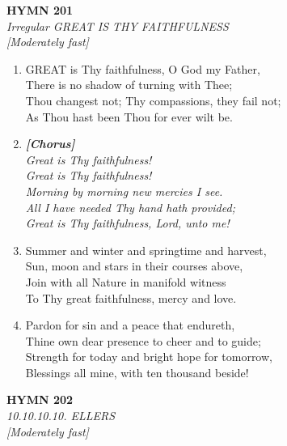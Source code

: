 \documentclass[11pt,a4paper]{article}
\begin{document}
\newpage
\begin{center}
    {\Large \textbf{HYMN 201}}
    \\
    \textit{Irregular GREAT IS THY FAITHFULNESS}
    \\
    \textit{\small [Moderately fast]}
\end{center}
\vspace{1em}

\begin{enumerate}
    \item GREAT is Thy faithfulness, O God my Father, \\
        There is no shadow of turning with Thee; \\
        Thou changest not; Thy compassions, they fail not; \\
        As Thou hast been Thou for ever wilt be.

    \item[] \vspace{0.4em}
    \textbf{\textit{[Chorus]}} \\
    \textit{Great is Thy faithfulness!} \\
    \textit{Great is Thy faithfulness!} \\
    \textit{Morning by morning new mercies I see.} \\
    \textit{All I have needed Thy hand hath provided;} \\
    \textit{Great is Thy faithfulness, Lord, unto me!}
    \vspace{0.4em}

    \item Summer and winter and springtime and harvest, \\
        Sun, moon and stars in their courses above, \\
        Join with all Nature in manifold witness \\
        To Thy great faithfulness, mercy and love.

    \item Pardon for sin and a peace that endureth, \\
        Thine own dear presence to cheer and to guide; \\
        Strength for today and bright hope for tomorrow, \\
        Blessings all mine, with ten thousand beside!

\end{enumerate}

\newpage
\begin{center}
    {\Large \textbf{HYMN 202}}
    \\
    \textit{10.10.10.10. ELLERS}
    \\
    \textit{\small [Moderately fast]}
\end{center}
\vspace{1em}
\end{document}
